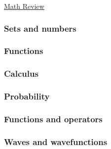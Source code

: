 \documentclass[main.tex]{subfiles}
\begin{document}
\href{https://www2.seas.gwu.edu/~simhaweb/quantum/modules/review/math-review/math-review.html}{Math Review}

\subsubsection{Sets and numbers}

\subsubsection{Functions}

\subsubsection{Calculus}

\subsubsection{Probability}

\subsubsection{Functions and operators}

\subsubsection{Waves and wavefunctions}
\end{document}
